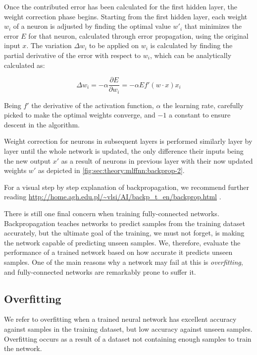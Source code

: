 Once the contributed error has been calculated for the first hidden layer, the weight correction phase begins.
Starting from the first hidden layer, each weight $w_i$ of a neuron is adjusted by finding the optimal value $w'_i$ that minimizes the error $E$ for that neuron, calculated through error propagation, using the original input $x$.
The variation $\Delta w_i$ to be applied on $w_i$ is calculated by finding the partial derivative of the error with respect to $w_i$, which can be analytically calculated \cite{Orr2008} as:

\begin{equation}
  \Delta w_i =
    -\alpha \frac{\partial E}{\partial w_i} =
    -\alpha E f'({w}\cdot{x}) x_i
\end{equation}

Being $f'$ the derivative of the activation function, $\alpha$ the learning rate, carefully picked to make the optimal weights converge, and $-1$ a constant to ensure descent in the algorithm.

Weight correction for neurons in subsequent layers is performed similarly layer by layer until the whole network is updated, the only difference their inputs being the new output $x'$ as a result of neurons in previous layer with their now updated weights $w'$ as depicted in \autoref{fig:sec:theory:mlffnn:backprop-2}.

For a visual step by step explanation of backpropagation, we recommend further reading \url{http://home.agh.edu.pl/~vlsi/AI/backp_t_en/backprop.html} \cite{Bernacki2005}.

There is still one final concern when training fully-connected networks.
Backpropagation teaches networks to predict samples from the training dataset accurately, but the ultimate goal of the training, we must not forget, is making the network capable of predicting unseen samples.
We, therefore, evaluate the performance of a trained network based on how accurate it predicts unseen samples.
One of the main reasons why a network may fail at this is \emph{overfitting}, and fully-connected networks are remarkably prone to suffer it.


\subsection{Overfitting}
\label{sec:theory:mlffnn:overfitting}

We refer to overfitting when a trained neural network has excellent accuracy against samples in the training dataset, but low accuracy against unseen samples.
Overfitting occurs as a result of a dataset not containing enough samples to train the network.

